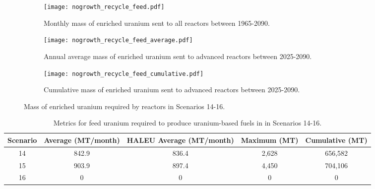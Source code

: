 \begin{figure}[h!]
    \centering
    \begin{subfigure}[b]{0.45\textwidth}
        \centering
        \texttt{[image: nogrowth\_recycle\_feed.pdf]}
        \caption{Monthly mass of enriched uranium sent to all reactors 
        between 1965-2090.}
        \label{fig:nogrowth_recycle_all_feed}
    \end{subfigure}
    \hfill
    \begin{subfigure}[b]{0.45\textwidth}
        \centering
        \texttt{[image: nogrowth\_recycle\_feed\_average.pdf]}
        \caption{Annual average mass of enriched uranium sent to 
        advanced reactors between 2025-2090.}
        \label{fig:nogrowth_recycle_AR_feed}
    \end{subfigure}
    \begin{subfigure}[b]{0.45\textwidth}
        \centering
        \texttt{[image: nogrowth\_recycle\_feed\_cumulative.pdf]}
        \caption{Cumulative mass of enriched 
        uranium sent to advanced reactors between 2025-2090.}
        \label{fig:nogrowth_recycle_feed_cumulative}
    \end{subfigure}
       \caption{Mass of enriched uranium required by reactors
        in Scenarios 14-16.}
       \label{fig:nogrowth_recycle_feed}
\end{figure}

\begin{table}[h!]
    \centering 
    \caption{Metrics for feed uranium required to produce 
    uranium-based fuels in in Scenarios 14-16.}
    \label{tab:s14-16_feed}
    \begin{tabular}{c c c c c}
        \hline 
        Scenario & Average (MT/month) & HALEU Average (MT/month) &
        Maximum (MT) & Cumulative (MT) \\
        \hline 
        14 & 842.9 & 836.4 & 2,628 & 656,582 \\
        15 & 903.9 & 897.4 & 4,450 & 704,106\\
        16 & 0 & 0 & 0 & 0\\
        \hline
        
    \end{tabular}
\end{table}



